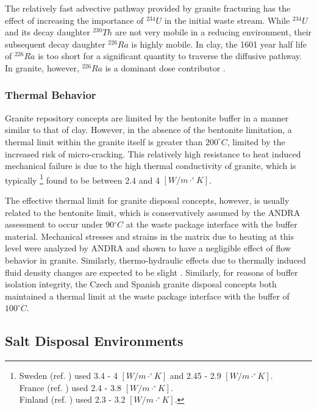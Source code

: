 The relatively fast advective pathway provided by granite fracturing
has the effect of increasing the importance of $^{234}U$ in the initial waste 
stream. While $^{234}U$ and its decay daughter $^{230}Th$ are not very mobile 
in a reducing environment, their subsequent decay daughter $^{226}Ra$ is highly 
mobile. In clay, the 1601 year half life of $^{226}Ra$ is too short for a 
significant quantity to traverse the diffusive pathway. In granite, however,  
$^{226}Ra$ is a dominant dose contributor \cite{swift_applying_2010}. 

\subsubsection{Thermal Behavior}
\label{subsec:granitethermal}

Granite repository concepts are limited by the bentonite buffer in a manner 
similar to that of clay. However, in the absence of the bentonite limitation, a 
thermal limit within the granite itself is greater than $200^{\circ}C$, limited 
by the increased risk of micro-cracking. This relatively high resistance to heat  
induced mechanical failure is due to the high thermal conductivity of granite, which is 
typically 
\footnote{
Sweden (ref. \cite{ab_long-term_2006}) used 3.4 - 4 $[W/m\cdot^{\circ}K]$ and 2.45 - 2.9 $[W/m\cdot^{\circ}K]$.\\
France (ref. \cite{andra_argile:_2005}) used 2.4 - 3.8 $[W/m\cdot^{\circ}K]$.\\
Finland (ref. \cite{posiva_interim_2010}) used 2.3 - 3.2 $[W/m\cdot^{\circ}K]$. 
}
found to be between 2.4 and 4 $[W/m\cdot^{\circ}K]$. 

The effective thermal limit for granite disposal concepts, however, is usually 
related to the bentonite limit, which is conservatively assumed by the \gls{ANDRA} assessment to occur under 
90$^{\circ}C$ at the waste package interface with the buffer material.  
Mechanical stresses and strains in the matrix due to heating at this 
level were analyzed by \gls{ANDRA} and shown to have a negligible effect of 
flow behavior in granite. Similarly, thermo-hydraulic effects due to thermally
induced fluid density changes are expected to be slight 
\cite{andra_granite:_2005}.
Similarly, for reasons of buffer isolation integrity, the Czech and Spanish
granite disposal concepts both maintained a thermal limit at the waste package
interface with the buffer of $100^{\circ}C$.  \cite{von_lensa_red-impact_2008}

\subsection{Salt Disposal Environments}

